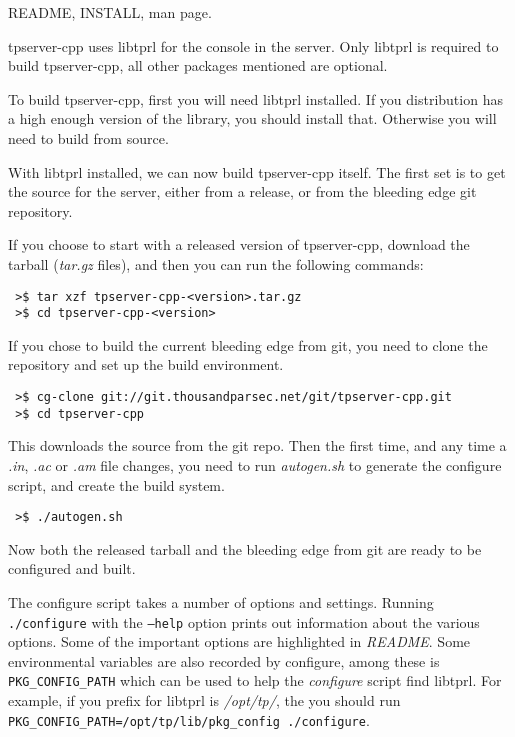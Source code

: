 \documentclass[a4paper,11pt]{report}
\newcommand{\filename}[1]{\emph{#1}}
\newcommand{\codename}[1]{\texttt{#1}}
\begin{document}
README, INSTALL, man page.

tpserver-cpp uses libtprl for the console in the server. Only libtprl is required to build tpserver-cpp, all other packages mentioned are optional.


To build tpserver-cpp, first you will need libtprl installed. If you distribution has a high enough version of the library, you should install that. Otherwise you will need to build from source.



With libtprl installed, we can now build tpserver-cpp itself. The first set is to get the source for the server, either from a release, or from the bleeding edge git repository.

If you choose to start with a released version of tpserver-cpp, download the tarball (\filename{tar.gz} files), and then you can run the following commands:

\begin{verbatim}
 >$ tar xzf tpserver-cpp-<version>.tar.gz
 >$ cd tpserver-cpp-<version>
\end{verbatim}

If you chose to build the current bleeding edge from git, you need to clone the repository and set up the build environment.

\begin{verbatim}
 >$ cg-clone git://git.thousandparsec.net/git/tpserver-cpp.git
 >$ cd tpserver-cpp
\end{verbatim}

This downloads the source from the git repo.
Then the first time, and any time a \filename{.in}, \filename{.ac} or \filename{.am} file changes, you need to run \filename{autogen.sh} to generate the configure script, and create the build system.

\begin{verbatim}
 >$ ./autogen.sh
\end{verbatim}

Now both the released tarball and the bleeding edge from git are ready to be configured and built.

The configure script takes a number of options and settings. Running \codename{./configure} with the  \codename{--help} option prints out information about the various options. Some of the important options are highlighted in \filename{README}. Some environmental variables are also recorded by configure, among these is \codename{PKG\_CONFIG\_PATH} which can be used to help the \filename{configure} script find libtprl. For example, if you prefix for libtprl is \filename{/opt/tp/}, the you should run \codename{PKG\_CONFIG\_PATH=/opt/tp/lib/pkg\_config ./configure}.
\end{document}
